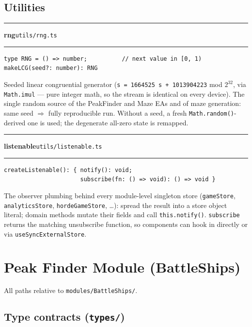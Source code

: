 \documentclass[11pt,a4paper]{report}
\newcommand{\srcfile}[1]{\texttt{\small #1}}   %
\newcommand{\ts}[1]{\texttt{#1}}               %
\newenvironment{apientry}[2]{%
  \par\medskip\noindent
  \begin{minipage}{\textwidth}
  \hrule\vspace{0.6ex}
  {\large\ttfamily\bfseries #1}\hfill{\footnotesize\srcfile{#2}}
  \vspace{0.4ex}\hrule\medskip
}{%
  \end{minipage}\par\medskip
}
\begin{document}
\section{Utilities}

\begin{apientry}{rng}{utils/rng.ts}
\begin{lstlisting}
type RNG = () => number;          // next value in [0, 1)
makeLCG(seed?: number): RNG
\end{lstlisting}
Seeded linear congruential generator (\ts{s = 1664525 s + 1013904223}
mod $2^{32}$, via \ts{Math.imul} --- pure integer math, so the stream is
identical on every device). The single random source of the PeakFinder
and Maze EAs and of maze generation: same seed $\Rightarrow$ fully
reproducible run. Without a seed, a fresh \ts{Math.random()}-derived one
is used; the degenerate all-zero state is remapped.
\end{apientry}

\begin{apientry}{listenable}{utils/listenable.ts}
\begin{lstlisting}
createListenable(): { notify(): void;
                      subscribe(fn: () => void): () => void }
\end{lstlisting}
The observer plumbing behind every module-level singleton store
(\ts{gameStore}, \ts{analyticsStore}, \ts{hordeGameStore}, \ldots):
spread the result into a store object literal; domain methods mutate
their fields and call \ts{this.notify()}. \ts{subscribe} returns the
matching unsubscribe function, so components can hook in directly or via
\ts{useSyncExternalStore}.
\end{apientry}

\chapter{Peak Finder Module (BattleShips)}
\label{ch:api-battleships}

All paths relative to \srcfile{modules/BattleShips/}.

\section{Type contracts (\srcfile{types/})}
\end{document}
